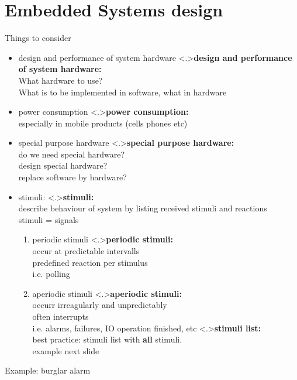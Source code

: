 \documentclass[ngerman={babel}, utf8, bigger, xcolor={table,dvipsnames}, ompress, hyperref={bookmarks,colorlinks}]{beamer}
\begin{document}
\section{Embedded Systems design}
\begin{frame}{Things to consider}
	\begin{itemize}
		\item design and performance of system hardware
		\note<.>{\textbf{design and performance of system hardware:}\\What hardware to use? \\ What is to be implemented in software, what in hardware}
		\item power consumption
		\note<.>{\textbf{power consumption:}\\ especially in mobile products (cells phones etc)}
		\item special purpose hardware
		\note<.>{\textbf{special purpose hardware:}\\ do we need special hardware? \\ design special hardware? \\ replace software by hardware?}
		\item stimuli:
		\note<.>{\textbf{stimuli:}\\ describe behaviour of system by listing received stimuli and reactions \\ stimuli = signals \\}
			\begin{enumerate}
				\item periodic stimuli
				\note<.>{\textbf{periodic stimuli:}\\occur at predictable intervalls \\ predefined reaction per stimulus \\ i.e. polling}
				\item aperiodic stimuli
				\note<.>{\textbf{aperiodic stimuli:}\\ occurr irreagularly and unpredictably \\ often interrupts \\ i.e. alarms, failures, IO operation finished, etc}
				\note<.>{\textbf{stimuli list:}\\best practice: stimuli list with \textbf{all} stimuli. \\ example next slide}
			\end{enumerate}
	\end{itemize}
\end{frame}

\begin{frame}{Example: burglar alarm}
\end{frame}
\end{document}
